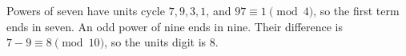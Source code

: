 Powers of seven have units cycle $7,9,3,1$, and $97\equiv1\pmod4$, so the first term ends in seven. An odd power of nine ends in nine. Their difference is $7-9\equiv8\pmod{10}$, so the units digit is $\boxed8$.
